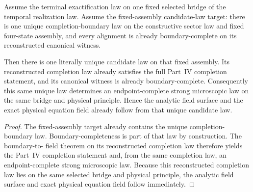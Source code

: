 \begin{theorem}
\label{thm:fixed-assembly-candidate-law-surface}
Assume the terminal exactification law on one fixed selected bridge of the
temporal realization law. Assume the fixed-assembly candidate-law target:
there is one unique completion-boundary law on the constructive sector law and
fixed four-state assembly, and every alignment is already boundary-complete on
its reconstructed canonical witness.

Then there is one literally unique candidate law on that fixed assembly. Its
reconstructed completion law already satisfies the full Part~IV completion
statement, and its canonical witness is already boundary-complete.
Consequently this same unique law determines an endpoint-complete strong
microscopic law on the same bridge and physical principle. Hence the analytic
field surface and the exact physical equation field already follow from that
unique candidate law.
\end{theorem}

\begin{proof}
The fixed-assembly target already contains the unique completion-boundary law.
Boundary-completeness is part of that law by construction. The boundary-to-
field theorem on its reconstructed completion law therefore yields the Part~IV
completion statement and, from the same completion law, an endpoint-complete
strong microscopic law. Because this reconstructed completion law lies on the
same selected bridge and physical principle, the analytic field surface and
exact physical equation field follow immediately.
\end{proof}


